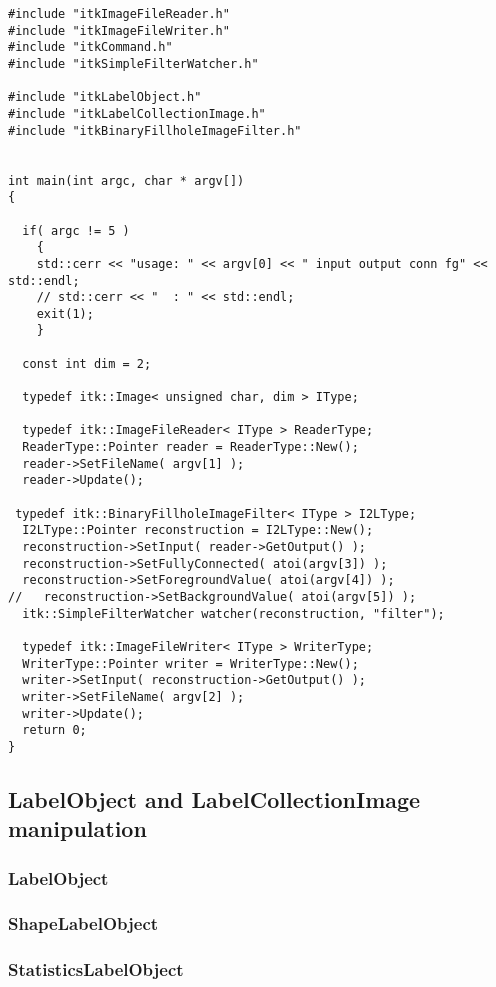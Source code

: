 \documentclass{InsightArticle}
\begin{document}
\small \begin{verbatim}
#include "itkImageFileReader.h"
#include "itkImageFileWriter.h"
#include "itkCommand.h"
#include "itkSimpleFilterWatcher.h"

#include "itkLabelObject.h"
#include "itkLabelCollectionImage.h"
#include "itkBinaryFillholeImageFilter.h"


int main(int argc, char * argv[])
{

  if( argc != 5 )
    {
    std::cerr << "usage: " << argv[0] << " input output conn fg" << std::endl;
    // std::cerr << "  : " << std::endl;
    exit(1);
    }

  const int dim = 2;

  typedef itk::Image< unsigned char, dim > IType;

  typedef itk::ImageFileReader< IType > ReaderType;
  ReaderType::Pointer reader = ReaderType::New();
  reader->SetFileName( argv[1] );
  reader->Update();

 typedef itk::BinaryFillholeImageFilter< IType > I2LType;
  I2LType::Pointer reconstruction = I2LType::New();
  reconstruction->SetInput( reader->GetOutput() );
  reconstruction->SetFullyConnected( atoi(argv[3]) );
  reconstruction->SetForegroundValue( atoi(argv[4]) );
//   reconstruction->SetBackgroundValue( atoi(argv[5]) );
  itk::SimpleFilterWatcher watcher(reconstruction, "filter");

  typedef itk::ImageFileWriter< IType > WriterType;
  WriterType::Pointer writer = WriterType::New();
  writer->SetInput( reconstruction->GetOutput() );
  writer->SetFileName( argv[2] );
  writer->Update();
  return 0;
}
\end{verbatim} \normalsize

\subsection{LabelObject and LabelCollectionImage manipulation}

\subsubsection{LabelObject}

\subsubsection{ShapeLabelObject}

\subsubsection{StatisticsLabelObject}
\end{document}
